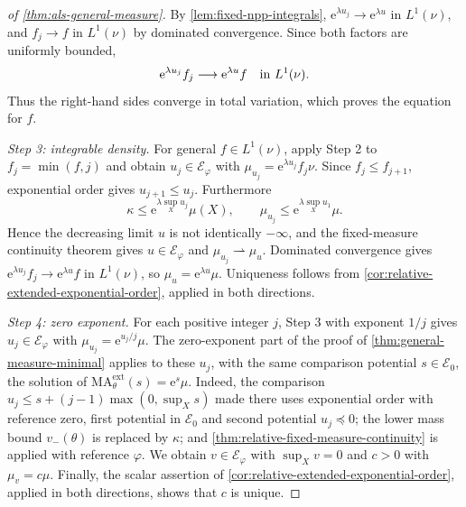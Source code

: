 \begin{proof}[of \cref{thm:als-general-measure}]
By \cref{lem:fixed-npp-integrals}, $\mathrm{e}^{\lambda u_j}\to \mathrm{e}^{\lambda u}$ in $L^1(\nu)$, and $f_j\to f$ in $L^1(\nu)$ by dominated convergence. Since both factors are uniformly bounded,
\[
 \mathrm{e}^{\lambda u_j}f_j\longrightarrow \mathrm{e}^{\lambda u}f
 \quad\hbox{in }L^1(\nu).
\]
Thus the right-hand sides converge in total variation, which proves the equation for $f$.

\emph{Step 3: integrable density.} For general $f\in L^1(\nu)$, apply Step 2 to $f_j=\min(f,j)$ and obtain $u_j\in\mathcal E_\varphi$ with $\mu_{u_j}=\mathrm{e}^{\lambda u_j}f_j\nu$. Since $f_j\leq f_{j+1}$, exponential order gives $u_{j+1}\leq u_j$. Furthermore
\[
 \kappa\leq \mathrm{e}^{\lambda\sup_Xu_j}\mu(X),
 \qquad \mu_{u_j}\leq \mathrm{e}^{\lambda\sup_Xu_1}\mu.
\]
Hence the decreasing limit $u$ is not identically $-\infty$, and the fixed-measure continuity theorem gives $u\in\mathcal E_\varphi$ and $\mu_{u_j}\rightharpoonup\mu_u$. Dominated convergence gives $\mathrm{e}^{\lambda u_j}f_j\to \mathrm{e}^{\lambda u}f$ in $L^1(\nu)$, so $\mu_u=\mathrm{e}^{\lambda u}\mu$. Uniqueness follows from \cref{cor:relative-extended-exponential-order}, applied in both directions.

\emph{Step 4: zero exponent.} For each positive integer $j$, Step 3 with exponent $1/j$ gives $u_j\in\mathcal E_\varphi$ with $\mu_{u_j}=\mathrm{e}^{u_j/j}\mu$. The zero-exponent part of the proof of \cref{thm:general-measure-minimal} applies to these $u_j$, with the same comparison potential $s\in\mathcal E_0$, the solution of $\mathrm{MA}^{\mathrm{ext}}_\theta(s)=\mathrm{e}^s\mu$. Indeed, the comparison $u_j\leq s+(j-1)\max(0,\sup_Xs)$ made there uses exponential order with reference zero, first potential in $\mathcal E_0$ and second potential $u_j\preceq0$; the lower mass bound $v_-(\theta)$ is replaced by $\kappa$; and \cref{thm:relative-fixed-measure-continuity} is applied with reference $\varphi$. We obtain $v\in\mathcal E_\varphi$ with $\sup_Xv=0$ and $c>0$ with $\mu_v=c\mu$. Finally, the scalar assertion of \cref{cor:relative-extended-exponential-order}, applied in both directions, shows that $c$ is unique.
\end{proof}
